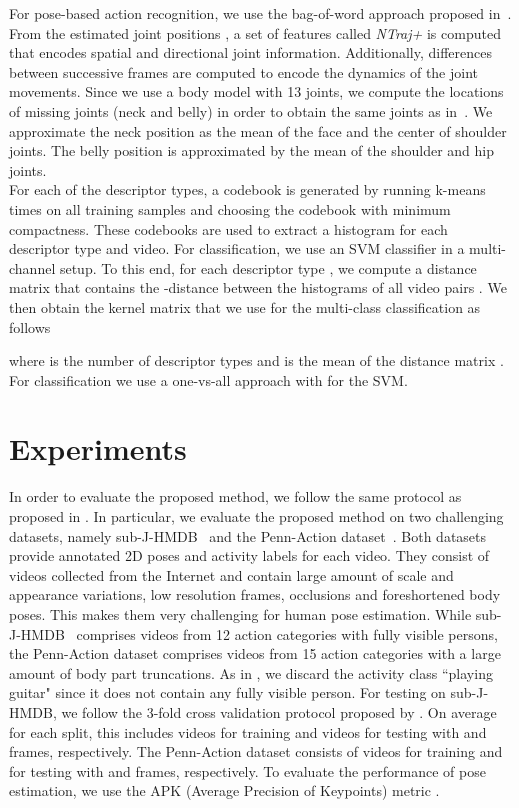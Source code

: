 \documentclass[a4paper, 10pt, conference]{ieeeconf}      \usepackage{FG2017}
\begin{document}
For pose-based action recognition, we use the bag-of-word approach proposed in~\cite{Jhuang_iccv2013}. 
From the estimated joint positions , a set of features called \emph{NTraj+} is computed that encodes spatial and directional joint information. Additionally, differences between successive frames are computed to encode the dynamics of the joint movements. Since we use a body model with 13 joints, we compute the locations of missing joints (neck and belly) in order to obtain the same  joints as in~\cite{Jhuang_iccv2013}. We approximate the neck position as the mean of the face and the center of shoulder joints. The belly position is approximated by the mean of the shoulder and hip joints. \\
\indent For each of the  descriptor types, a codebook is generated by running k-means  times on all training samples and choosing the codebook with minimum compactness. These codebooks are used to extract a histogram for each descriptor type and video. 
For classification, we use an SVM classifier in a multi-channel setup. To this end, for each descriptor type , we compute a distance matrix  that contains the -distance between the histograms  of all video pairs . We then obtain the kernel matrix that we use for the multi-class classification as follows 

where  is the number of descriptor types and  is the mean of the distance matrix . For classification we use a one-vs-all approach with  for the SVM.

\section{Experiments}
\label{sec:experiments}
In order to evaluate the proposed method, we follow the same protocol as proposed in \cite{bruce_cvpr2015}. In particular, we evaluate the proposed method on two challenging datasets, namely \mbox{sub-J-HMDB}~\cite{Jhuang_iccv2013}
and the Penn-Action dataset~\cite{zhang2013actemes}. Both datasets provide annotated 2D poses and activity labels for each video. They consist of videos collected from the Internet and contain large amount of scale and appearance variations, low resolution frames, occlusions and foreshortened body poses. This makes them very challenging for human pose estimation. 
While sub-J-HMDB~\cite{Jhuang_iccv2013} comprises videos from 12 action categories with fully visible persons, the Penn-Action dataset comprises videos from 15 action categories with a large amount of body part truncations. As in \cite{bruce_cvpr2015}, we discard the activity class ``playing guitar" since it does not contain any fully visible person. 
For testing on sub-J-HMDB, we follow the 3-fold cross validation protocol proposed by \cite{Jhuang_iccv2013}. On average for each split, this includes  videos for training and  videos for testing with  and  frames, respectively. 
The Penn-Action dataset consists of  videos for training and  for testing with  and  frames, respectively. 
To evaluate the performance of pose estimation, we use the APK (Average Precision of Keypoints) metric \cite{yang_tpami2014,bruce_cvpr2015}. 
\end{document}
